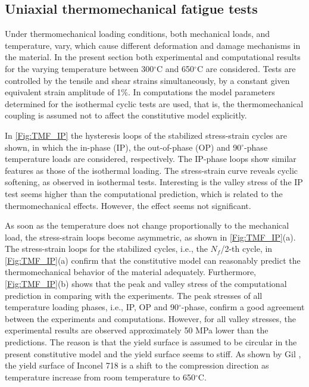 \subsection{Uniaxial thermomechanical fatigue tests}
\noindent
Under thermomechanical loading conditions, both mechanical loads, and temperature, vary, which cause different deformation and damage mechanisms in the material.
In the present section both experimental and computational results for the varying temperature between 300$^\circ$C and 650$^\circ$C are considered. Tests are controlled by the tensile and shear strains simultaneously, by a constant given equivalent strain amplitude of 1\%. In computations the model parameters determined for the isothermal cyclic tests are used, that is, the thermomechanical coupling is assumed not to affect the constitutive model explicitly.

In \ref{Fig:TMF_IP} the hysteresis loops of the stabilized stress-strain cycles are shown, in which the in-phase (IP), the out-of-phase (OP) and 90$^\circ$-phase temperature loads are considered, respectively.
The IP-phase loops show similar features as those of the isothermal loading.
The stress-strain curve reveals cyclic softening, as observed in isothermal tests. Interesting is the valley stress of the IP test seems higher than the computational prediction, which is related to the thermomechanical effects. However, the effect seems not significant.

As soon as the temperature does not change proportionally to the mechanical load, the stress-strain loops become asymmetric, as shown in \ref{Fig:TMF_IP}(a).
The stress-strain loops for the stabilized cycles, i.e., the $N_f$/2-th cycle, in \ref{Fig:TMF_IP}(a) confirm that the constitutive model can reasonably predict the thermomechanical behavior of the material adequately.
Furthermore, \ref{Fig:TMF_IP}(b) shows that the peak and valley stress of the computational prediction in comparing with the experiments.
The peak stresses of all temperature loading phases, i.e., IP, OP and 90$^\circ$-phase, confirm a good agreement between the experiments and computations.
However, for all valley stresses, the experimental results are observed approximately 50 MPa lower than the predictions.
The reason is that the yield surface is assumed to be circular in the present constitutive model and the yield surface seems to stiff.
As shown by Gil \cite{Gil1998}, the yield surface of Inconel 718 is a shift to the compression direction as temperature increase from room temperature to 650$^\circ$C.

